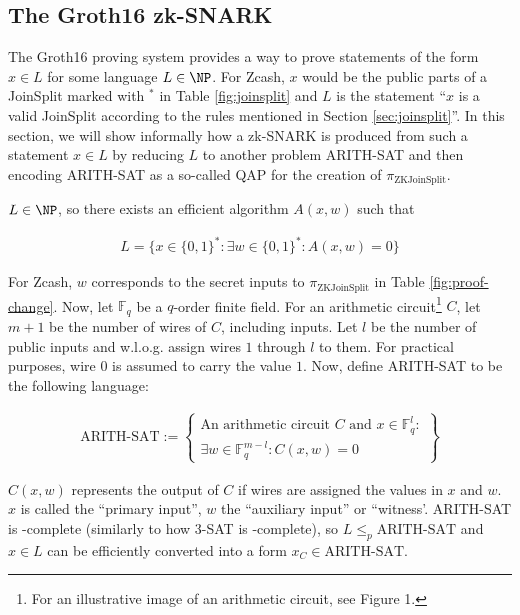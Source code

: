 \documentclass{article}
\begin{document}
\subsection{The Groth16 zk-SNARK}

The Groth16 proving system provides a way to prove statements of the form $x \in L$ for some language $L \in \NP$.
For Zcash, $x$ would be the public parts of a JoinSplit marked with $^\ast$ in Table \ref{fig:joinsplit} and $L$ is the statement ``$x$ is a valid JoinSplit according to the rules mentioned in Section \ref{sec:joinsplit}''.
In this section, we will show informally how a zk-SNARK is produced from such a statement $x \in L$ by reducing $L$ to another problem ARITH-SAT and then encoding ARITH-SAT as a so-called QAP for the creation of $\pi_\text{ZKJoinSplit}$.

$L \in \NP$, so there exists an efficient algorithm $A(x, w)$ such that

\begin{align*} L = \{ x \in \{0,1\}^\ast \colon \exists w \in \{0,1\}^\ast\colon A(x, w) = 0\} \end{align*}

For Zcash, $w$ corresponds to the secret inputs to $\pi_\text{ZKJoinSplit}$ in Table \ref{fig:proof-change}.
Now, let $\mathbb{F}_q$ be a $q$-order finite field.
For an arithmetic circuit\footnote{For an illustrative image of an arithmetic circuit, see \cite{gennaro:qap} Figure 1.} $C$, let $m + 1$ be the number of wires of $C$, including inputs.
Let $l$ be the number of public inputs and w.l.o.g. assign wires $1$ through $l$ to them.
For practical purposes, wire $0$ is assumed to carry the value $1$.
Now, define ARITH-SAT to be the following language:

\begin{align*}
        \text{ARITH-SAT} := \left\{\begin{aligned}\text{An arithmetic circuit } C \text{ and } x \in \mathbb{F}_q^l \colon \\
        \exists w \in \mathbb{F}_q^{m-l}\colon C(x,w) = 0\end{aligned}\right\}
\end{align*}

$C(x,w)$ represents the output of $C$ if wires are assigned the values in $x$ and $w$.
$x$ is called the ``primary input'', $w$ the ``auxiliary input'' or ``witness'.
ARITH-SAT is \NP-complete (similarly to how 3-SAT is \NP-complete), so $L \leq_p \text{ARITH-SAT}$ and $x \in L$ can be efficiently converted into a form $x_C \in \text{ARITH-SAT}$.
\end{document}
